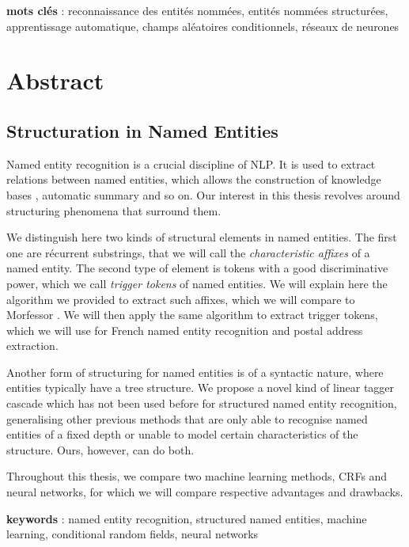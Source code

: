 \documentclass[12pt,a4paper,times,twoside,openright]{report}
\begin{document}
\begin{flushleft}
\textbf{mots clés} : reconnaissance des entités nommées, entités nommées structurées, apprentissage automatique, champs aléatoires conditionnels, réseaux de neurones
\end{flushleft}



\chapter*{Abstract}
\section*{Structuration in Named Entities}
Named entity recognition is a crucial discipline of NLP. It is used to extract relations between named entities, which allows the construction of knowledge bases \citep{surdeanu2014overview}, automatic summary \citep{nobata2002summarization} and so on. Our interest in this thesis revolves around structuring phenomena that surround them.

We distinguish here two kinds of structural elements in named entities. The first one are récurrent substrings, that we will call the \emph{characteristic affixes} of a named entity. The second type of element is tokens with a good discriminative power, which we call \emph{trigger tokens} of named entities. We will explain here the algorithm we provided to extract such affixes, which we will compare to Morfessor \citep{creutz2005unsupervised}. We will then apply the same algorithm to extract trigger tokens, which we will use for French named entity recognition and postal address extraction.

Another form of structuring for named entities is of a syntactic nature, where entities typically have a tree structure. We propose a novel kind of linear tagger cascade which has not been used before for structured named entity recognition, generalising other previous methods that are only able to recognise named entities of a fixed depth or unable to model certain characteristics of the structure. Ours, however, can do both.

Throughout this thesis, we compare two machine learning methods, CRFs and neural networks, for which we will compare respective advantages and drawbacks.

\begin{flushleft}
\textbf{keywords} : named entity recognition, structured named entities, machine learning, conditional random fields, neural networks
\end{flushleft}
\end{document}
